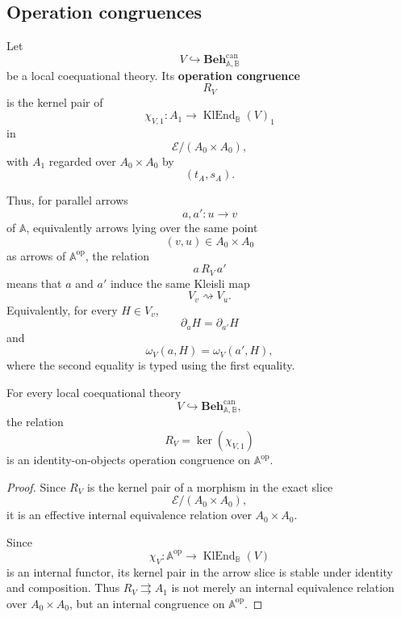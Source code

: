 \subsection{Operation congruences}
\label{subsec:to-operation-congruences}

\begin{definition}
\label{def:to-operation-congruence-of-local-theory}
    Let
    \[
        V\hookrightarrow
        \mathbf{Beh}^{\mathrm{can}}_{\mathbb A,\mathbb B}
    \]
    be a local coequational theory. Its \textbf{operation congruence}
    \[
        R_V
    \]
    is the kernel pair of
    \[
        \chi_{V,1}:A_1\to
        \operatorname{KlEnd}_{\mathbb B}(V)_1
    \]
    in
    \[
        \mathcal E/(A_0\times A_0),
    \]
    with \(A_1\) regarded over \(A_0\times A_0\) by
    \[
        (t_A,s_A).
    \]
\end{definition}

Thus, for parallel arrows
\[
    a,a':u\to v
\]
of \(\mathbb A\), equivalently arrows lying over the same point
\[
    (v,u)\in A_0\times A_0
\]
as arrows of \(\mathbb A^{\mathrm{op}}\), the relation
\[
    a\,R_V\,a'
\]
means that \(a\) and \(a'\) induce the same Kleisli map
\[
    V_v\rightsquigarrow V_u.
\]
Equivalently, for every \(H\in V_v\),
\[
    \partial_aH=\partial_{a'}H
\]
and
\[
    \omega_V(a,H)=\omega_V(a',H),
\]
where the second equality is typed using the first equality.

\begin{lemma}
\label{lem:to-kernel-operation-congruence}
    For every local coequational theory
    \[
        V\hookrightarrow
        \mathbf{Beh}^{\mathrm{can}}_{\mathbb A,\mathbb B},
    \]
    the relation
    \[
        R_V=\ker(\chi_{V,1})
    \]
    is an identity-on-objects operation congruence on
    \(\mathbb A^{\mathrm{op}}\).
\end{lemma}

\begin{proof}
    Since \(R_V\) is the kernel pair of a morphism in the exact slice
    \[
        \mathcal E/(A_0\times A_0),
    \]
    it is an effective internal equivalence relation over
    \(A_0\times A_0\).

    Since
    \[
        \chi_V:
        \mathbb A^{\mathrm{op}}\to\operatorname{KlEnd}_{\mathbb B}(V)
    \]
    is an internal functor, its kernel pair in the arrow slice is stable under
    identity and composition. Thus \(R_V\rightrightarrows A_1\) is not merely
    an internal equivalence relation over \(A_0\times A_0\), but an internal
    congruence on \(\mathbb A^{\mathrm{op}}\).
\end{proof}

